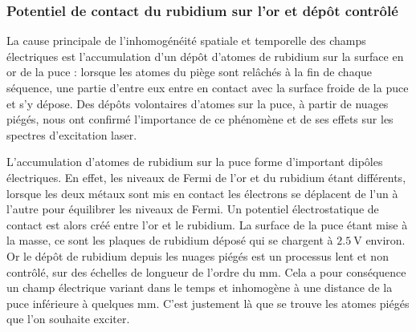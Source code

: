
\subsubsection*{Potentiel de contact du rubidium sur l'or et dépôt contrôlé}
\noindent La cause principale de l'inhomogénéité spatiale et temporelle des champs électriques est l'accumulation d'un dépôt d'atomes de rubidium sur la surface en or de la puce :
lorsque les atomes du piège sont relâchés à la fin de chaque séquence, une partie d'entre eux entre en contact avec la surface froide de la puce et s'y dépose.
Des dépôts volontaires d'atomes sur la puce, à partir de nuages piégés, nous ont confirmé l'importance de ce phénomène et de ses effets sur les spectres d'excitation laser.

L'accumulation d'atomes de rubidium sur la puce forme d'important dipôles électriques.
En effet, les niveaux de Fermi de l'or et du rubidium étant différents, lorsque les deux métaux sont mis en contact les électrons se déplacent de l'un à l'autre pour équilibrer les niveaux de Fermi.
Un potentiel électrostatique de contact est alors créé entre l'or et le rubidium.
La surface de la puce étant mise à la masse, ce sont les plaques de rubidium déposé qui se chargent à $\SI{2.5}{\V}$ environ.
Or le dépôt de rubidium depuis les nuages piégés est un processus lent et non contrôlé, sur des échelles de longueur de l'ordre du $\si{\mm}$.
Cela a pour conséquence un champ électrique variant dans le temps et inhomogène à une distance de la puce inférieure à quelques $\si{\mm}$.
C'est justement là que se trouve les atomes piégés que l'on souhaite exciter.

